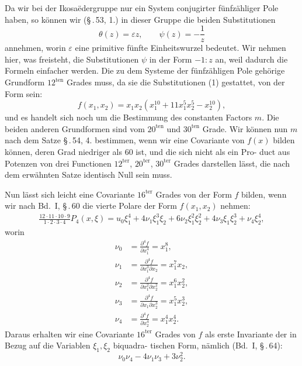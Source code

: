\documentclass[12pt,a4paper]{article}
\theoremstyle{plain}
\theoremstyle{definition}
\theoremstyle{remark}
\begin{document}
Da wir bei der Ikosa\"edergruppe nur ein System conjugirter
f\"unfz\"ahliger Pole haben, so k\"onnen wir (\S\,.\,53, 1.) in dieser Gruppe
die beiden Substitutionen
\begin{equation}\label{eq:58_1}
\theta(z) = \varepsilon z,\qquad \psi(z) = -\frac{1}{z}\tag{1}
\end{equation}
annehmen, worin $\varepsilon$ eine primitive f\"unfte Einheitswurzel bedeutet.
Wir nehmen hier, was freisteht, die Substitutionen $\psi$ in der
Form $-1 : z$ an, weil dadurch die Formeln einfacher werden.
Die zu dem Systeme der f\"unfz\"ahligen Pole geh\"orige Grundform
$12^{\text{ten}}$ Grades muss, da sie die Substitutionen (1) gestattet, von
der Form sein:
\begin{equation}\label{eq:58_2}
f(x_1, x_2) = x_1 x_2 (x_1^{10} + 11x_1^5 x_2^5 - x_2^{10}),\tag{2}
\end{equation}
und es handelt sich noch um die Bestimmung des constanten
Factors $m$. Die beiden anderen Grundformen sind vom $20^{\text{ten}}$
und $30^{\text{ten}}$ Grade. Wir k\"onnen nun $m$ nach dem Satze \S\,.\,54, 4.
bestimmen, wenn wir eine Covariante von $f(x)$ bilden k\"onnen,
deren Grad niedriger als 60 ist, und die sich nicht als ein Pro-
duct aus Potenzen von drei Functionen $12^{\text{ter}}$, $20^{\text{ter}}$, $30^{\text{ter}}$ Grades
darstellen l\"asst, die nach dem erw\"ahnten Satze identisch Null
sein muss.

Nun l\"asst sich leicht eine Covariante $16^{\text{ter}}$ Grades von der
Form $f$ bilden, wenn wir nach Bd.~I, \S\,.\,60 die vierte Polare der
Form $f(x_1, x_2)$ nehmen:
\begin{multline*}
\frac{12\cdot 11\cdot 10\cdot 9}{1\cdot 2\cdot 3\cdot 4} P_4(x, \xi) =
u_0\xi_1^4 + 4\nu_1\xi_1^3\xi_2 + 6\nu_2\xi_1^2\xi_2^2 + 4\nu_3\xi_1\xi_2^3 + \nu_4\xi_2^4,
\end{multline*}
worin
\begin{align*}
\nu_0 &= \frac{\partial^4 f}{\partial x_1^4} = x_1^8,\\
\nu_1 &= \frac{\partial^4 f}{\partial x_1^3\partial x_2} = x_1^7 x_2,\\
\nu_2 &= \frac{\partial^4 f}{\partial x_1^2\partial x_2^2} = x_1^6 x_2^2,\\
\nu_3 &= \frac{\partial^4 f}{\partial x_1\partial x_2^3} = x_1^5 x_2^3,\\
\nu_4 &= \frac{\partial^4 f}{\partial x_2^4} = x_1^4 x_2^4.
\end{align*}
Daraus erhalten wir eine Covariante $16^{\text{ter}}$ Grades von $f$ als
erste Invariante der in Bezug auf die Variablen $\xi_1, \xi_2$ biquadra-
tischen Form, n\"amlich (Bd.~I, \S\,.\,64):
\begin{equation}\label{eq:58_3}
\nu_0\nu_4 - 4\nu_1\nu_3 + 3\nu_2^2.\tag{3}
\end{equation}
\end{document}
